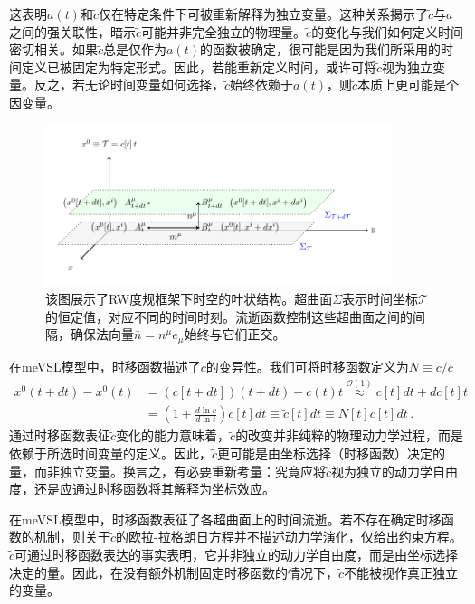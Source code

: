 \documentclass[jkps,preprint,fleqn]{revtex4}
\newcommand{\tc}{\tilde{c}}
\begin{document}
\begin{CJK*}{UTF8}{gbsn}
这表明$a(t)$和$\tc$仅在特定条件下可被重新解释为独立变量。这种关系揭示了$\tc$与$a$之间的强关联性，暗示$\tc$可能并非完全独立的物理量。$\tc$的变化与我们如何定义时间密切相关。如果$\tc$总是仅作为$a(t)$的函数被确定，很可能是因为我们所采用的时间定义已被固定为特定形式。因此，若能重新定义时间，或许可将$\tc$视为独立变量。反之，若无论时间变量如何选择，$\tc$始终依赖于$a(t)$，则$\tc$本质上更可能是个因变量。

\begin{figure}
	\begin{center}
	\includegraphics[width=0.9\textwidth]{Fig2.pdf}
	\caption{该图展示了RW度规框架下时空的叶状结构。超曲面$\Sigma$表示时间坐标$\mathcal{T}$的恒定值，对应不同的时间时刻。流逝函数控制这些超曲面之间的间隔，确保法向量$\bar{n} = n^{\mu} e_{\mu}$始终与它们正交。}
	\label{Fig2}
	\end{center}
\end{figure}

在meVSL模型中，时移函数描述了$\tc$的变异性。我们可将时移函数定义为$N \equiv \tc/c$
\begin{align}
x^{0}(t+dt) - x^{0}(t) &=  \left( c[t+dt] \right) \left( t+dt \right) - c(t) t \overset{\mathcal{O}(1)}{\approx} c[t] dt + dc[t] t \nonumber \\
	&= \left( 1 + \frac{d \ln c}{d \ln t} \right) c[t] dt \equiv \tilde{c}[t] dt \equiv N[t] c[t] dt \label{NmeVSL} \,.
\end{align}
通过时移函数表征$\tc$变化的能力意味着，$\tc$的改变并非纯粹的物理动力学过程，而是依赖于所选时间变量的定义。因此，$\tc$更可能是由坐标选择（时移函数）决定的量，而非独立变量。换言之，有必要重新考量：究竟应将$\tc$视为独立的动力学自由度，还是应通过时移函数将其解释为坐标效应。

在meVSL模型中，时移函数表征了各超曲面上的时间流逝。若不存在确定时移函数的机制，则关于$\tc$的欧拉-拉格朗日方程并不描述动力学演化，仅给出约束方程。$\tc$可通过时移函数表达的事实表明，它并非独立的动力学自由度，而是由坐标选择决定的量。因此，在没有额外机制固定时移函数的情况下，$\tc$不能被视作真正独立的变量。


\end{CJK*}
\end{document}
